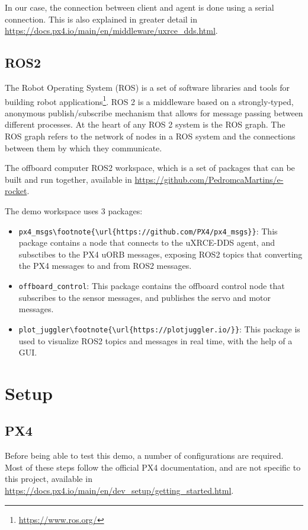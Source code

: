 \documentclass[a4paper]{article}
\begin{document}
In our case, the connection between client and agent is done using a serial connection. 
This is also explained in greater detail in \url{https://docs.px4.io/main/en/middleware/uxrce_dds.html}. 

\subsection{ROS2}

The Robot Operating System (ROS) is a set of software libraries and tools for building robot applications\footnote{\url{https://www.ros.org/}}. 
ROS 2 is a middleware based on a strongly-typed, anonymous publish/subscribe mechanism that allows for message passing between different processes. 
At the heart of any ROS 2 system is the ROS graph. The ROS graph refers to the network of nodes in a ROS system and the connections between them by which they communicate. 

The offboard computer  ROS2 workspace, which is a set of packages that can be built and run together, available in \url{https://github.com/PedromcaMartins/e-rocket}. 

The demo workspace uses 3 packages: 
\begin{itemize}
    \item \verb|px4_msgs\footnote{\url{https://github.com/PX4/px4_msgs}}|: This package contains a node that connects to the uXRCE-DDS agent, and subsctibes to the PX4 uORB messages, exposing ROS2 topics that converting the PX4 messages to and from ROS2 messages.
    \item \verb|offboard_control|: This package contains the offboard control node that subscribes to the sensor messages, and publishes the servo and motor messages.
    \item \verb|plot_juggler\footnote{\url{https://plotjuggler.io/}}|: This package is used to visualize ROS2 topics and messages in real time, with the help of a GUI.
\end{itemize}


\clearpage
\section{Setup}

\subsection{PX4}

Before being able to test this demo, a number of configurations are required. 
Most of these steps follow the official PX4 documentation, and are not specific to this project, available in \url{https://docs.px4.io/main/en/dev_setup/getting_started.html}. 
\end{document}
